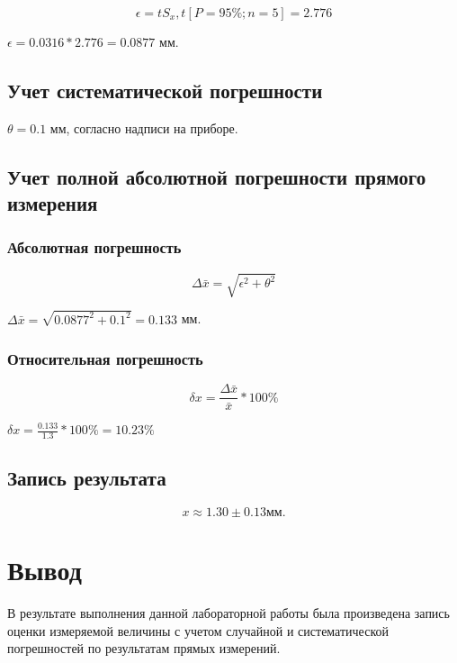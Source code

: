 \documentclass[12pt, a4paper]{article}
\begin{document}
$$\epsilon = t S_x, t [P = 95\%; n = 5] = 2.776$$

$\epsilon = 0.0316 * 2.776 = 0.0877$ мм.

\subsection*{Учет систематической погрешности}

$\theta = 0.1$ мм, согласно надписи на приборе.

\subsection*{Учет полной абсолютной погрешности прямого измерения}

\subsubsection*{Абсолютная погрешность}

$$\Delta \bar{x} = \sqrt{\epsilon^2 + \theta^2}$$

$\Delta \bar{x} = \sqrt{0.0877^2 + 0.1^2} = 0.133$ мм.

\subsubsection*{Относительная погрешность}

$$\delta x = \frac{\Delta \bar{x}}{\bar{x}} * 100\%$$

$\delta x = \frac{0.133}{1.3} * 100\% = 10.23\%$

\subsection*{Запись результата}

$$x \approx 1.30 \pm 0.13 \text{мм.}$$

\section*{Вывод}

В результате выполнения данной лабораторной работы была произведена
запись оценки измеряемой величины с учетом случайной и систематической
погрешностей по результатам прямых измерений.
\end{document}
